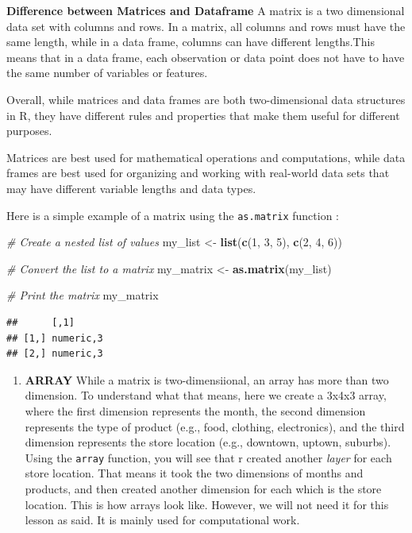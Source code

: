\documentclass[
]{article}
\newenvironment{Shaded}{\begin{snugshade}}{\end{snugshade}}
\newcommand{\CommentTok}[1]{\textcolor[rgb]{0.56,0.35,0.01}{\textit{#1}}}
\newcommand{\DecValTok}[1]{\textcolor[rgb]{0.00,0.00,0.81}{#1}}
\newcommand{\FunctionTok}[1]{\textcolor[rgb]{0.13,0.29,0.53}{\textbf{#1}}}
\newcommand{\NormalTok}[1]{#1}
\newcommand{\OtherTok}[1]{\textcolor[rgb]{0.56,0.35,0.01}{#1}}
\providecommand{\tightlist}{%
  \setlength{\itemsep}{0pt}\setlength{\parskip}{0pt}}
\begin{document}
\textbf{Difference between Matrices and Dataframe} A matrix is a two
dimensional data set with columns and rows. In a matrix, all columns and
rows must have the same length, while in a data frame, columns can have
different lengths.This means that in a data frame, each observation or
data point does not have to have the same number of variables or
features.

Overall, while matrices and data frames are both two-dimensional data
structures in R, they have different rules and properties that make them
useful for different purposes.

Matrices are best used for mathematical operations and computations,
while data frames are best used for organizing and working with
real-world data sets that may have different variable lengths and data
types.

Here is a simple example of a matrix using the \texttt{as.matrix}
function :

\begin{Shaded}
\begin{Highlighting}[]
\CommentTok{\# Create a nested list of values}
\NormalTok{my\_list }\OtherTok{\textless{}{-}} \FunctionTok{list}\NormalTok{(}\FunctionTok{c}\NormalTok{(}\DecValTok{1}\NormalTok{, }\DecValTok{3}\NormalTok{, }\DecValTok{5}\NormalTok{), }\FunctionTok{c}\NormalTok{(}\DecValTok{2}\NormalTok{, }\DecValTok{4}\NormalTok{, }\DecValTok{6}\NormalTok{))}

\CommentTok{\# Convert the list to a matrix}
\NormalTok{my\_matrix }\OtherTok{\textless{}{-}} \FunctionTok{as.matrix}\NormalTok{(my\_list)}

\CommentTok{\# Print the matrix}
\NormalTok{my\_matrix}
\end{Highlighting}
\end{Shaded}

\begin{verbatim}
##      [,1]     
## [1,] numeric,3
## [2,] numeric,3
\end{verbatim}

\begin{enumerate}
\def\labelenumi{\arabic{enumi}.}
\setcounter{enumi}{7}
\tightlist
\item
  \textbf{ARRAY} While a matrix is two-dimensiional, an array has more
  than two dimension. To understand what that means, here we create a
  3x4x3 array, where the first dimension represents the month, the
  second dimension represents the type of product (e.g., food, clothing,
  electronics), and the third dimension represents the store location
  (e.g., downtown, uptown, suburbs). Using the \texttt{array} function,
  you will see that r created another \emph{layer} for each store
  location. That means it took the two dimensions of months and
  products, and then created another dimension for each which is the
  store location. This is how arrays look like. However, we will not
  need it for this lesson as said. It is mainly used for computational
  work.
\end{enumerate}
\end{document}
